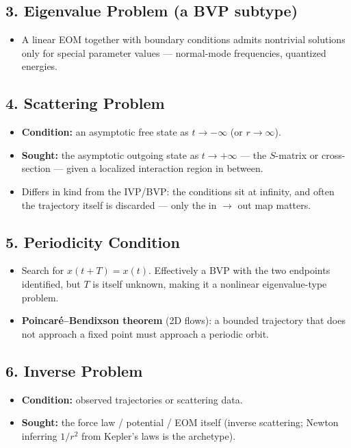 \documentclass[11pt]{article}
\begin{document}
\subsection*{3. Eigenvalue Problem (a BVP subtype)}
\begin{itemize}[leftmargin=*]
  \item A linear EOM together with boundary conditions admits
  nontrivial solutions only for special parameter values ---
  normal-mode frequencies, quantized energies.
\end{itemize}

\subsection*{4. Scattering Problem}
\begin{itemize}[leftmargin=*]
  \item \textbf{Condition:} an asymptotic free state as $t \to
  -\infty$ (or $r \to \infty$).
  \item \textbf{Sought:} the asymptotic outgoing state as $t \to
  +\infty$ --- the $S$-matrix or cross-section --- given a localized
  interaction region in between.
  \item Differs in kind from the IVP/BVP: the conditions sit at
  infinity, and often the trajectory itself is discarded --- only the
  in $\to$ out map matters.
\end{itemize}

\subsection*{5. Periodicity Condition}
\begin{itemize}[leftmargin=*]
  \item Search for $x(t+T) = x(t)$. Effectively a BVP with the two
  endpoints identified, but $T$ is itself unknown, making it a
  nonlinear eigenvalue-type problem.
  \item \textbf{Poincar\'e--Bendixson theorem} (2D flows): a bounded
  trajectory that does not approach a fixed point must approach a
  periodic orbit.
\end{itemize}

\subsection*{6. Inverse Problem}
\begin{itemize}[leftmargin=*]
  \item \textbf{Condition:} observed trajectories or scattering data.
  \item \textbf{Sought:} the force law / potential / EOM itself
  (inverse scattering; Newton inferring $1/r^2$ from Kepler's laws is
  the archetype).
\end{itemize}
\end{document}
